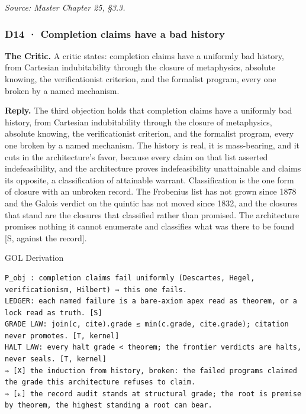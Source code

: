 \documentclass[10pt,twocolumn]{article}
\begin{document}
\emph{Source: Master Chapter 25, §3.3.}

\hypertarget{d14-completion-claims-have-a-bad-history}{%
\subsubsection{D14 · Completion claims have a bad
history}\label{d14-completion-claims-have-a-bad-history}}

\textbf{The Critic.} A critic states: completion claims have a uniformly
bad history, from Cartesian indubitability through the closure of
metaphysics, absolute knowing, the verificationist criterion, and the
formalist program, every one broken by a named mechanism.

\textbf{Reply.} The third objection holds that completion claims have a
uniformly bad history, from Cartesian indubitability through the closure
of metaphysics, absolute knowing, the verificationist criterion, and the
formalist program, every one broken by a named mechanism. The history is
real, it is mass-bearing, and it cuts in the architecture's favor,
because every claim on that list asserted indefeasibility, and the
architecture proves indefeasibility unattainable and claims its
opposite, a classification of attainable warrant. Classification is the
one form of closure with an unbroken record. The Frobenius list has not
grown since 1878 and the Galois verdict on the quintic has not moved
since 1832, and the closures that stand are the closures that classified
rather than promised. The architecture promises nothing it cannot
enumerate and classifies what was there to be found {[}S, against the
record{]}.

\begin{golbox}{GOL Derivation}
\begin{lstlisting}[style=golv]
P_obj : completion claims fail uniformly (Descartes, Hegel, verificationism, Hilbert) ⇒ this one fails.
LEDGER: each named failure is a bare-axiom apex read as theorem, or a lock read as truth. [S]
GRADE LAW: join(c, cite).grade ≤ min(c.grade, cite.grade); citation never promotes. [T, kernel]
HALT LAW: every halt grade < theorem; the frontier verdicts are halts, never seals. [T, kernel]
⇒ [X] the induction from history, broken: the failed programs claimed the grade this architecture refuses to claim.
⇒ [⟀] the record audit stands at structural grade; the root is premise by theorem, the highest standing a root can bear.
\end{lstlisting}
\end{golbox}
\end{document}
